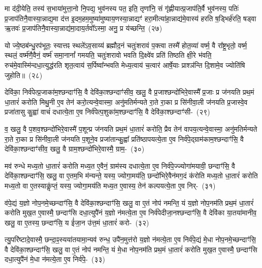 मा द॑दी॒येति॒ तस्य॑ स॒भाया॑मुत्ता॒नो नि॒पद्य॒ भुव॑नस्य पत॒ इति॒ तृणा॑नि॒ सं गृ॑ह्णीयात्प्र॒जा\-प॑ति॒र्वै भुव॑नस्य॒ पतिः॑ प्र॒जा\-प॑तिनै॒वास्या॒न्नाद्य॒मा द॑त्त इ॒दम॒हम॒मुष्या॑मुष्याय॒णस्या॒न्नाद्यꣳ॑ हरा॒मीत्या॑हा॒न्नाद्य॑मे॒वास्य॑ हरति ष॒ड्भिर्\mbox{}ह॑रति॒ षड्वा ऋ॒तवः॑ प्र॒जा\-प॑तिनै॒वास्या॒न्नाद्य॑मा॒दाय॒र्तवो᳚\-ऽस्मा॒ अनु॒ प्र य॑च्छन्ति॒~(२७)

यो ज्ये॒ष्ठब॑न्धु॒रप॑भूतः॒ स्यात्तꣴ स्थले॑\-ऽव॒साय्य॑ ब्रह्मौद॒नं चतुः॑शरावं प॒क्त्वा तस्मै॑ होत॒व्या॑ वर्ष्म॒ वै रा᳚ष्ट्र॒भृतो॒ वर्ष्म॒ स्थलं॒ वर्ष्म॑णै॒वैनं॒ वर्ष्म॑ समा॒नानां᳚ गमयति॒ चतुः॑शरावो भवति दि॒क्ष्वे॑व प्रति॑ तिष्ठति क्षी॒रे भ॑वति॒ रुच॑मे॒वास्मि॑\-न्दधा॒त्युद्ध॑रति शृत॒त्वाय॑ स॒र्पिष्वा᳚न्भवति मेध्य॒त्वाय॑ च॒त्वार॑ आर्\mbox{}षे॒याः प्राश्ञ॑न्ति दि॒शामे॒व ज्योति॑षि जुहोति॥~(२८)

{\anuvakamend[{ग्रा॒मी यु॑नक्ती॒ध्मः स्व ए॒वैना॑न॒न्नाद्यं॑ यच्छ॒न्त्येका॒न्नप॑ञ्चा॒शच्च॑}]}%

देवि॑का॒ निर्व॑पेत्प्र॒जाका॑म॒श्छन्दाꣳ॑सि॒ वै देवि॑का॒श्छन्दाꣳ॑सीव॒ खलु॒ वै प्र॒जाश्छन्दो॑भिरे॒वास्मै᳚ प्र॒जाः प्र ज॑नयति प्रथ॒मं धा॒तारं॑ करोति मिथु॒नी ए॒व तेन॑ करो॒त्यन्वे॒वास्मा॒ अनु॑मतिर्मन्यते रा॒ते रा॒का प्र सि॑नीवा॒ली ज॑नयति प्र॒जास्वे॒व प्रजा॑तासु कु॒ह्वा॑ वाचं॑ दधात्ये॒ता ए॒व निर्व॑पेत्प॒शुका॑म॒श्छन्दाꣳ॑सि॒ वै देवि॑का॒श्छन्दाꣳ॑सी-~(२९)

व॒ खलु॒ वै प॒शव॒श्छन्दो॑भिरे॒वास्मै॑ प॒शून्प्र ज॑नयति प्रथ॒मं धा॒तारं॑ करोति॒ प्रैव तेन॑ वापय॒त्यन्वे॒वास्मा॒ अनु॑मतिर्मन्यते रा॒ते रा॒का प्र सि॑नीवा॒ली ज॑नयति प॒शूने॒व प्रजा॑तान्कु॒ह्वा᳚ प्रति॑\-ष्ठापयत्ये॒ता ए॒व निर्व॑पे॒द्ग्राम॑काम॒श्छन्दाꣳ॑सि॒ वै देवि॑का॒श्छन्दाꣳ॑सीव॒ खलु॒ वै ग्राम॒श्छन्दो॑भिरे॒वास्मै॒ ग्राम॒-~(३०)

मव॑ रुन्धे मध्य॒तो धा॒तारं॑ करोति मध्य॒त ए॒वैनं॒ ग्राम॑स्य दधात्ये॒ता ए॒व निर्व॑पे॒ज्ज्योगा॑मयावी॒ छन्दाꣳ॑सि॒ वै देवि॑का॒श्छन्दाꣳ॑सि॒ खलु॒ वा ए॒तम॒भि म॑न्यन्ते॒ यस्य॒ ज्योगा॒मय॑ति॒ छन्दो॑भिरे॒वैन॑मग॒दं क॑रोति मध्य॒तो धा॒तारं॑ करोति मध्य॒तो वा ए॒तस्याकॢ॑प्तं॒ यस्य॒ ज्योगा॒मय॑ति मध्य॒त ए॒वास्य॒ तेन॑ कल्पयत्ये॒ता ए॒व निर्-~(३१)

व॑पे॒द्यं य॒ज्ञो नोप॒नमे॒च्छन्दाꣳ॑सि॒ वै देवि॑का॒श्छन्दाꣳ॑सि॒ खलु॒ वा ए॒तं नोप॑ नमन्ति॒ यं य॒ज्ञो नोप॒नम॑ति प्रथ॒मं धा॒तारं॑ करोति मुख॒त ए॒वास्मै॒ छन्दाꣳ॑सि दधा॒त्युपै॑नं य॒ज्ञो न॑मत्ये॒ता ए॒व निर्व॑पेदीजा॒नश्छन्दाꣳ॑सि॒ वै देवि॑का या॒तया॑मानीव॒ खलु॒ वा ए॒तस्य॒ छन्दाꣳ॑सि॒ य ई॑जा॒न उ॑त्त॒मं धा॒तारं॑ करो-~(३२)

त्यु॒परि॑ष्टादे॒वास्मै॒ छन्दा॒ꣴ॒स्यया॑तयामा॒न्यव॑ रुन्ध॒ उपै॑न॒मुत्त॑रो य॒ज्ञो न॑मत्ये॒ता ए॒व निर्व॑पे॒द्यं मे॒धा नोप॒नमे॒च्छन्दाꣳ॑सि॒ वै देवि॑का॒श्छन्दाꣳ॑सि॒ खलु॒ वा ए॒तं नोप॑ नमन्ति॒ यं मे॒धा नोप॒नम॑ति प्रथ॒मं धा॒तारं॑ करोति मुख॒त ए॒वास्मै॒ छन्दाꣳ॑सि दधा॒त्युपै॑नं मे॒धा न॑मत्ये॒ता ए॒व निर्व॑पे॒-~(३३)

